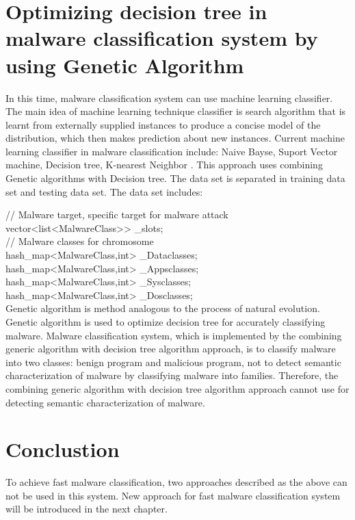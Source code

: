 \section{Optimizing decision tree in malware classification system by using Genetic Algorithm}
In this time, malware classification system can use machine learning classifier. The main idea of machine learning technique classifier is search algorithm that is learnt from externally supplied instances to produce a concise model of the distribution, which then  makes prediction about new  instances. Current machine learning classifier in malware classification include: Naive Bayse, Suport Vector machine, Decision tree, K-nearest Neighbor \cite{mohd}. This approach uses combining Genetic algorithms with Decision tree. The data set is separated in training data set and testing data set. The data set includes:

// Malware target, specific target for malware attack\\
vector<list<MalwareClass\*>> \_slots;\\
// Malware classes for chromosome\\
hash\_map<MalwareClass\*,int> \_Dataclasses;\\
hash\_map<MalwareClass\*,int> \_Appsclasses;\\
hash\_map<MalwareClass\*,int> \_Sysclasses;\\
hash\_map<MalwareClass\*,int> \_Dosclasses;\\

Genetic algorithm is method analogous to the process of natural evolution. Genetic algorithm is used to optimize decision tree for accurately classifying malware. Malware classification system, which is implemented by the combining generic algorithm with decision tree algorithm approach, is to classify malware into two classes: benign program and malicious program, not to detect semantic characterization of malware by classifying malware into families. Therefore, the combining generic algorithm with decision tree algorithm approach cannot use for detecting semantic characterization of malware.
\section{Conclustion}
To achieve fast malware classification, two approaches described as the above can not be used in this system. New approach for fast malware classification system will be introduced in the next chapter. 